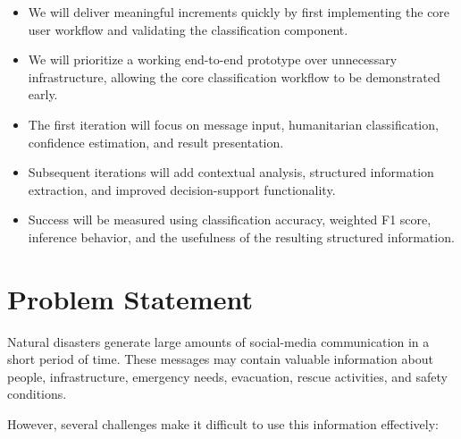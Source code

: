 \documentclass[11pt,a4paper]{article}
\begin{document}
\begin{itemize}[leftmargin=0.7cm]

    \item We will deliver meaningful increments quickly by first implementing
    the core user workflow and validating the classification component.

    \item We will prioritize a working end-to-end prototype over unnecessary
    infrastructure, allowing the core classification workflow to be
    demonstrated early.

    \item The first iteration will focus on message input, humanitarian
    classification, confidence estimation, and result presentation.

    \item Subsequent iterations will add contextual analysis, structured
    information extraction, and improved decision-support functionality.

    \item Success will be measured using classification accuracy, weighted
    F1 score, inference behavior, and the usefulness of the resulting
    structured information.

\end{itemize}


\section{Problem Statement}

Natural disasters generate large amounts of social-media communication in a
short period of time. These messages may contain valuable information about
people, infrastructure, emergency needs, evacuation, rescue activities, and
safety conditions.

However, several challenges make it difficult to use this information
effectively:
\end{document}
